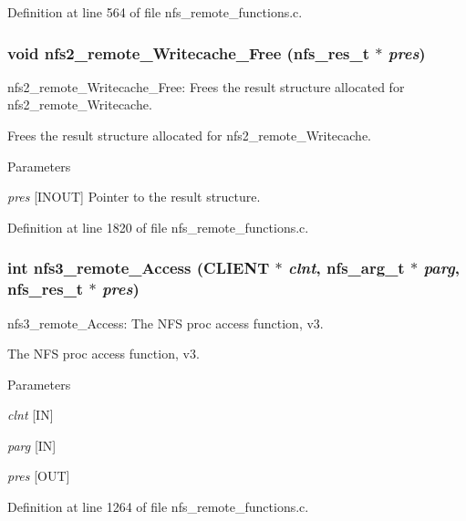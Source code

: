 Definition at line 564 of file nfs\_\-remote\_\-functions.c.
\subsubsection[{nfs2\_\-remote\_\-Writecache\_\-Free}]{\setlength{\rightskip}{0pt plus 5cm}void nfs2\_\-remote\_\-Writecache\_\-Free (nfs\_\-res\_\-t $\ast$ {\em pres})}\label{group__NFSprocs_ga21e909029d33f6170d14c16d19557aab}
nfs2\_\-remote\_\-Writecache\_\-Free: Frees the result structure allocated for nfs2\_\-remote\_\-Writecache.

Frees the result structure allocated for nfs2\_\-remote\_\-Writecache.


\begin{DoxyParams}{Parameters}
\item[{\em pres}][INOUT] Pointer to the result structure. \end{DoxyParams}


Definition at line 1820 of file nfs\_\-remote\_\-functions.c.
\subsubsection[{nfs3\_\-remote\_\-Access}]{\setlength{\rightskip}{0pt plus 5cm}int nfs3\_\-remote\_\-Access (CLIENT $\ast$ {\em clnt}, \/  nfs\_\-arg\_\-t $\ast$ {\em parg}, \/  nfs\_\-res\_\-t $\ast$ {\em pres})}\label{group__NFSprocs_ga44edf748249f381fca07b030136fc81e}
nfs3\_\-remote\_\-Access: The NFS proc access function, v3.

The NFS proc access function, v3.


\begin{DoxyParams}{Parameters}
\item[{\em clnt}][IN] \item[{\em parg}][IN] \item[{\em pres}][OUT] \end{DoxyParams}


Definition at line 1264 of file nfs\_\-remote\_\-functions.c.
